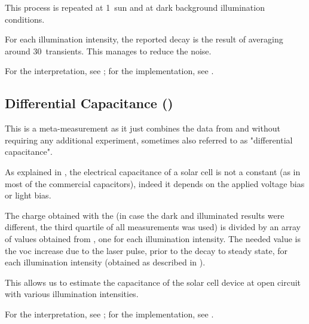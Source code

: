 		This process is repeated at 1~sun and at dark background illumination conditions.

		For each illumination intensity, the reported decay is the result of averaging around 30~transients. This manages to reduce the noise.
		
		For the interpretation, see ; for the implementation, see .

	\subsection{Differential Capacitance ()}

		This is a meta-measurement as it just combines the data from  and  without requiring any additional experiment\cite{Shuttle2008}, sometimes also referred to as "differential capacitance".

		As explained in , the electrical capacitance of a solar cell is not a constant (as in most of the commercial capacitors), indeed it depends on the applied voltage bias or light bias.

		The charge obtained with the  (in case the dark and illuminated results were different, the third quartile of all  measurements was used) is divided by an array of values obtained from , one for each illumination intensity. The needed value is the \gls{voc} increase due to the laser pulse, prior to the decay to steady state, for each illumination intensity (obtained as described in ).

		This allows us to estimate the capacitance of the solar cell device at open circuit with various illumination intensities.

		For the interpretation, see ; for the implementation, see .